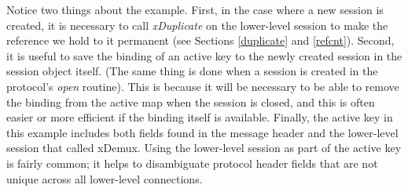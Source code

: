 Notice two things about the example. First, in the
case where a new session is created, it is necessary to call {\em
xDuplicate} on the lower-level session to make the reference we hold
to it permanent (see Sections \ref{duplicate} and \ref{refcnt}). 
Second, it is useful
to save the binding of an active key to the newly created session in
the session object itself. 
(The same thing is done when a session is created in the
protocol's {\em open} routine).
This is because it will be necessary to be able to remove the binding from the
active map when the session is closed, and this is often easier or
more efficient if the
binding itself is available.
Finally, the active key in this
example includes both fields found in the message header and the 
lower-level session that called xDemux. Using the lower-level session as
part of the active key is fairly common; it helps to disambiguate
protocol header fields that are not unique across all lower-level
connections.
